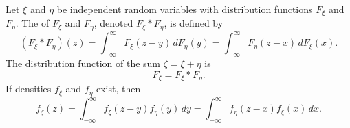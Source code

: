 Let $\xi$ and $\eta$ be independent random variables with distribution functions $F_\xi$ and $F_\eta$. The  of $F_\xi$ and $F_\eta$, denoted $F_\xi * F_\eta$, is defined by
$$(F_\xi * F_\eta)(z) = \int_{-\infty}^{\infty} F_\xi(z - y) \, dF_\eta(y) = \int_{-\infty}^{\infty} F_\eta(z - x) \, dF_\xi(x).$$
The distribution function of the sum $\zeta = \xi + \eta$ is
$$F_\zeta = F_\xi * F_\eta.$$
If densities $f_\xi$ and $f_\eta$ exist, then
$$f_\zeta(z) = \int_{-\infty}^{\infty} f_\xi(z - y) f_\eta(y) \, dy = \int_{-\infty}^{\infty} f_\eta(z - x) f_\xi(x) \, dx.$$
